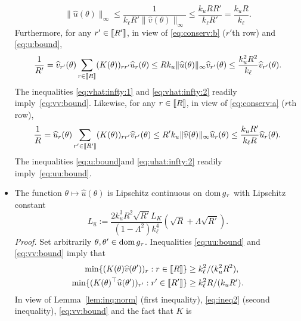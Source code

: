 \begin{itemize}
  \begin{equation}
    \label{eq:u:bound}
    \|\widehat{u}(\theta)\|_{\infty} \leq \frac{1}{k_{\ell}
      R'\|\widehat{v}(\theta)\|_{\infty}} \leq \frac{k_{u}RR'}{k_{\ell} R'} =
    \frac{k_{u}R}{k_{\ell}}.
  \end{equation}
  Furthermore, for any $r' \in \llbracket R'\rrbracket$, in view of
  \eqref{eq:conserv:b} ($r'$th row) and \eqref{eq:u:bound},
  \begin{equation}
    \label{eq:vhat:infty:2}
    \frac{1}{R'}
    = \widehat{v}_{r'}(\theta) \sum_{r \in \llbracket R \rrbracket}
    (K(\theta))_{rr'} \widehat{u}_r(\theta)
    \leq R k_{u} \|\widehat{u}(\theta)\|_{\infty}\widehat{v}_{r'}(\theta)
    \leq \frac{k_{u}^2R^2 }{k_{\ell}} \widehat{v}_{r'}(\theta).
  \end{equation}
The inequalities \eqref{eq:vhat:infty:1} and \eqref{eq:vhat:infty:2} readily
  imply~\eqref{eq:vv:bound}.            Likewise,            for           any
  $r  \in \llbracket  R \rrbracket$,  in view  of \eqref{eq:conserv:a}  ($r$th
  row),
  \begin{equation}
    \label{eq:uhat:infty:2}
    \frac{1}{R} = \widehat{u}_{r}(\theta) \sum_{r' \in \llbracket R' \rrbracket}
    (K(\theta))_{rr'} \widehat{v}_{r'}(\theta) 
    \leq R' k_{u} \|\widehat{v}(\theta)\|_{\infty} \widehat{u}_r(\theta) 
    \leq \frac{k_{u} R' }{k_{\ell} R} \widehat{u}_r(\theta).
  \end{equation}
  The   inequalities  \eqref{eq:u:bound}and   \eqref{eq:uhat:infty:2}  readily
  imply~\eqref{eq:uu:bound}.
\item The function $\theta \mapsto \widehat{u}(\theta)$ is Lipschitz
  continuous on $\operatorname{dom} g_{\tau}$ with Lipschitz constant
  \begin{equation*}
    L_{\widehat{u}}:= \frac{2k^{3}_{u}R^{2}\sqrt{R'}L_{K}}{(1 - \Lambda^2)k_{\ell}^{4}} 
    (\sqrt{R} + \Lambda\sqrt{R'}).
  \end{equation*}
  \textit{Proof.}   Set  arbitrarily  $\theta,  \theta'  \in  \operatorname{dom}  g_{\tau}$.
  Inequalities \eqref{eq:uu:bound} and \eqref{eq:vv:bound} imply that
  \begin{align*}
    \min\{(K(\theta)\widehat{v}(\theta'))_{r}   :    r   \in    \llbracket   R
    \rrbracket\} & \geq k^{2}_{\ell}/(k_{u}^{2}R^{2}),\\
    \min\{(K(\theta)^{\top}\widehat{u}(\theta'))_{r'}  :  r'  \in  \llbracket  R'
    \rrbracket \} & \geq k^{2}_{\ell}R/(k_{u}R'). 
  \end{align*}
In  view of  Lemma~\ref{lem:inq:norm}  (first inequality),  \eqref{eq:ineq2}
  (second  inequality),   \eqref{eq:vv:bound}  and   the  fact  that   $K$  is

\end{itemize}
